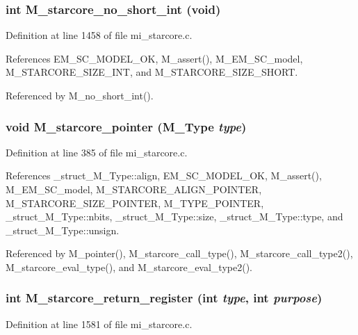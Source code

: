 \subsubsection{\setlength{\rightskip}{0pt plus 5cm}int M\_\-starcore\_\-no\_\-short\_\-int (void)}\label{mi__starcore_8c_d91b738f726df4e1941e8be47710af0d}




Definition at line 1458 of file mi\_\-starcore.c.

References EM\_\-SC\_\-MODEL\_\-OK, M\_\-assert(), M\_\-EM\_\-SC\_\-model, M\_\-STARCORE\_\-SIZE\_\-INT, and M\_\-STARCORE\_\-SIZE\_\-SHORT.

Referenced by M\_\-no\_\-short\_\-int().
\subsubsection{\setlength{\rightskip}{0pt plus 5cm}void M\_\-starcore\_\-pointer (\bf{M\_\-Type} {\em type})}\label{mi__starcore_8c_f7bbc6a04c383761e32b8a4f6211ecc6}




Definition at line 385 of file mi\_\-starcore.c.

References \_\-struct\_\-M\_\-Type::align, EM\_\-SC\_\-MODEL\_\-OK, M\_\-assert(), M\_\-EM\_\-SC\_\-model, M\_\-STARCORE\_\-ALIGN\_\-POINTER, M\_\-STARCORE\_\-SIZE\_\-POINTER, M\_\-TYPE\_\-POINTER, \_\-struct\_\-M\_\-Type::nbits, \_\-struct\_\-M\_\-Type::size, \_\-struct\_\-M\_\-Type::type, and \_\-struct\_\-M\_\-Type::unsign.

Referenced by M\_\-pointer(), M\_\-starcore\_\-call\_\-type(), M\_\-starcore\_\-call\_\-type2(), M\_\-starcore\_\-eval\_\-type(), and M\_\-starcore\_\-eval\_\-type2().
\subsubsection{\setlength{\rightskip}{0pt plus 5cm}int M\_\-starcore\_\-return\_\-register (int {\em type}, int {\em purpose})}\label{mi__starcore_8c_b6cd349676b4ca360be86e01115b649b}




Definition at line 1581 of file mi\_\-starcore.c.

